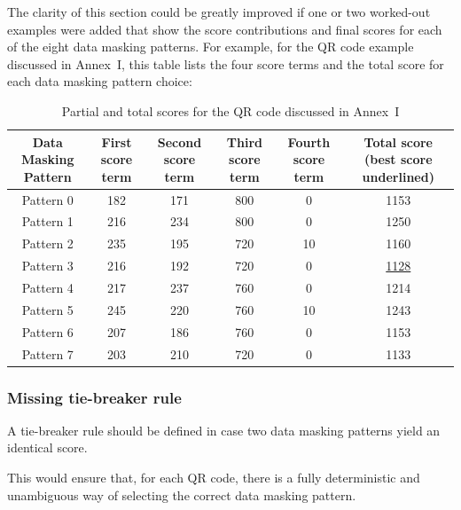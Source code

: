 \documentclass[a4paper,twoside]{article}
\newcommand{\best}[1]{\underline{#1}}
\begin{document}
The clarity of this section could be greatly improved if one or two worked-out examples were added that show the
score contributions and final scores for each of the eight data masking patterns. For example, for the QR code example discussed in
Annex~I, this table lists the four score terms and the total score for each data masking pattern choice:

\begin{table}[h]
\centering
\tiny
\begin{tabular}{|c|c|c|c|c|c|}
\hline
Data Masking Pattern & First score term & Second score term & Third score term & Fourth score term & Total score (best score underlined) \\
\hline
Pattern 0            & 182              & 171               & 800              &  0                & 1153        \\
Pattern 1            & 216              & 234               & 800              &  0                & 1250        \\
Pattern 2            & 235              & 195               & 720              & 10                & 1160        \\
Pattern 3            & 216              & 192               & 720              &  0                & \best{1128} \\
Pattern 4            & 217              & 237               & 760              &  0                & 1214        \\
Pattern 5            & 245              & 220               & 760              & 10                & 1243        \\
Pattern 6            & 207              & 186               & 760              &  0                & 1153        \\
Pattern 7            & 203              & 210               & 720              &  0                & 1133        \\
\hline
\end{tabular}
\caption{Partial and total scores for the QR code discussed in Annex~I}
\end{table}

\subsubsection*{Missing tie-breaker rule}

A tie-breaker rule should be defined in case two data masking patterns yield an identical score.

This would ensure that, for each QR code, there is a fully deterministic and unambiguous way of selecting the
correct data masking pattern.
\end{document}
